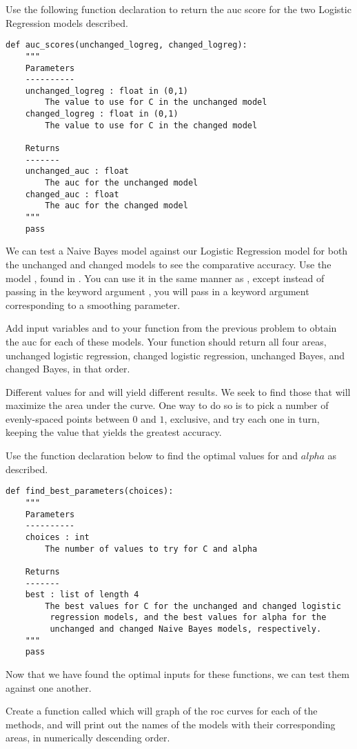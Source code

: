 \begin{problem}
Use the following function declaration to return the auc score for the two Logistic Regression models described.
\begin{lstlisting}
def auc_scores(unchanged_logreg, changed_logreg):
    """
    Parameters
    ----------
    unchanged_logreg : float in (0,1)
        The value to use for C in the unchanged model
    changed_logreg : float in (0,1)
        The value to use for C in the changed model

    Returns
    -------
    unchanged_auc : float
        The auc for the unchanged model
    changed_auc : float
        The auc for the changed model
    """
    pass
\end{lstlisting}
\end{problem}

We can test a Naive Bayes model against our Logistic Regression model for both the unchanged and changed models to see the comparative accuracy.  Use the model , found in .  You can use it in the same manner as , except instead of passing in the keyword argument , you will pass in a keyword argument  corresponding to a smoothing parameter.
\begin{problem}
Add input variables  and  to your function from the previous problem to obtain the auc for each of these models.  Your function should return all four areas, unchanged logistic regression, changed logistic regression, unchanged Bayes, and changed Bayes, in that order.
\end{problem}

Different values for  and  will yield different results.  We seek to find those that will maximize the area under the curve.  One way to do so is to pick a number of evenly-spaced points between $0$ and $1$, exclusive, and try each one in turn, keeping the value that yields the greatest accuracy.
\begin{problem}
Use the function declaration below to find the optimal values for  and $alpha$ as described.
\begin{lstlisting}
def find_best_parameters(choices):
    """
    Parameters
    ----------
    choices : int
        The number of values to try for C and alpha

    Returns
    -------
    best : list of length 4
        The best values for C for the unchanged and changed logistic
         regression models, and the best values for alpha for the
         unchanged and changed Naive Bayes models, respectively.
    """
    pass
\end{lstlisting}
\end{problem}

Now that we have found the optimal inputs for these functions, we can test them against one another.
\begin{problem}
Create a function called  which will graph of the roc curves for each of the methods, and will print out the names of the models with their corresponding areas, in numerically descending order.
\end{problem}